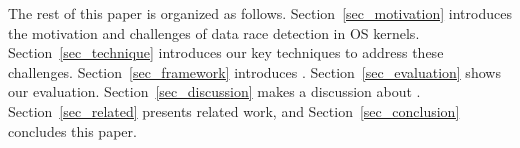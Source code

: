 The rest of this paper is organized as follows. Section~\ref{sec_motivation} 
introduces the motivation and challenges of data race detection in OS kernels. 
Section~\ref{sec_technique} introduces our key techniques to address these 
challenges. Section~\ref{sec_framework} introduces \sys. 
Section~\ref{sec_evaluation} shows our evaluation. Section~\ref{sec_discussion} 
makes a discussion about \sys. Section~\ref{sec_related} presents related 
work, and Section~\ref{sec_conclusion} concludes this paper.
